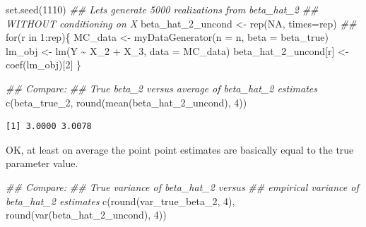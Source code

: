 \documentclass[
  letterpaper,
  DIV=11,
  numbers=noendperiod]{scrreprt}
\newenvironment{Shaded}{\begin{snugshade}}{\end{snugshade}}
\newcommand{\AttributeTok}[1]{\textcolor[rgb]{0.40,0.45,0.13}{#1}}
\newcommand{\ConstantTok}[1]{\textcolor[rgb]{0.56,0.35,0.01}{#1}}
\newcommand{\ControlFlowTok}[1]{\textcolor[rgb]{0.00,0.23,0.31}{#1}}
\newcommand{\DecValTok}[1]{\textcolor[rgb]{0.68,0.00,0.00}{#1}}
\newcommand{\DocumentationTok}[1]{\textcolor[rgb]{0.37,0.37,0.37}{\textit{#1}}}
\newcommand{\FunctionTok}[1]{\textcolor[rgb]{0.28,0.35,0.67}{#1}}
\newcommand{\NormalTok}[1]{\textcolor[rgb]{0.00,0.23,0.31}{#1}}
\newcommand{\OtherTok}[1]{\textcolor[rgb]{0.00,0.23,0.31}{#1}}
\newcommand{\SpecialCharTok}[1]{\textcolor[rgb]{0.37,0.37,0.37}{#1}}
\theoremstyle{definition}
\theoremstyle{plain}
\theoremstyle{plain}
\theoremstyle{remark}
\begin{document}
\begin{Shaded}
\begin{Highlighting}[]
\FunctionTok{set.seed}\NormalTok{(}\DecValTok{1110}\NormalTok{)}
\DocumentationTok{\#\# Let\textquotesingle{}s generate 5000 realizations from beta\_hat\_2 }
\DocumentationTok{\#\# WITHOUT conditioning on X}
\NormalTok{beta\_hat\_2\_uncond }\OtherTok{\textless{}{-}} \FunctionTok{rep}\NormalTok{(}\ConstantTok{NA}\NormalTok{, }\AttributeTok{times=}\NormalTok{rep)}
\DocumentationTok{\#\#}
\ControlFlowTok{for}\NormalTok{(r }\ControlFlowTok{in} \DecValTok{1}\SpecialCharTok{:}\NormalTok{rep)\{}
\NormalTok{    MC\_data }\OtherTok{\textless{}{-}} \FunctionTok{myDataGenerator}\NormalTok{(}\AttributeTok{n    =}\NormalTok{ n, }
                               \AttributeTok{beta =}\NormalTok{ beta\_true)}
\NormalTok{    lm\_obj               }\OtherTok{\textless{}{-}} \FunctionTok{lm}\NormalTok{(Y }\SpecialCharTok{\textasciitilde{}}\NormalTok{ X\_2 }\SpecialCharTok{+}\NormalTok{ X\_3, }\AttributeTok{data =}\NormalTok{ MC\_data)}
\NormalTok{    beta\_hat\_2\_uncond[r] }\OtherTok{\textless{}{-}} \FunctionTok{coef}\NormalTok{(lm\_obj)[}\DecValTok{2}\NormalTok{]}
\NormalTok{\}}

\DocumentationTok{\#\# Compare:}
\DocumentationTok{\#\# True beta\_2 versus average of beta\_hat\_2 estimates}
\FunctionTok{c}\NormalTok{(beta\_true\_2, }\FunctionTok{round}\NormalTok{(}\FunctionTok{mean}\NormalTok{(beta\_hat\_2\_uncond), }\DecValTok{4}\NormalTok{))}
\end{Highlighting}
\end{Shaded}

\begin{verbatim}
[1] 3.0000 3.0078
\end{verbatim}

OK, at least on average the point point estimates are basically equal to
the true parameter value.

\begin{Shaded}
\begin{Highlighting}[]
\DocumentationTok{\#\# Compare: }
\DocumentationTok{\#\# True variance of beta\_hat\_2 versus }
\DocumentationTok{\#\# empirical variance of beta\_hat\_2 estimates}
\FunctionTok{c}\NormalTok{(}\FunctionTok{round}\NormalTok{(var\_true\_beta\_2, }\DecValTok{4}\NormalTok{), }\FunctionTok{round}\NormalTok{(}\FunctionTok{var}\NormalTok{(beta\_hat\_2\_uncond), }\DecValTok{4}\NormalTok{))}
\end{Highlighting}
\end{Shaded}
\end{document}
